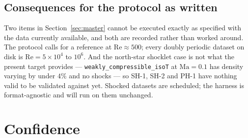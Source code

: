 \documentclass[11pt]{article}
\begin{document}
\subsection{Consequences for the protocol as written}

Two items in Section~\ref{sec:master} cannot be executed exactly as specified with the data
currently available, and both are recorded rather than worked around. The protocol calls for
a reference at $\mathrm{Re} \approx 500$; every doubly periodic dataset on disk is
$\mathrm{Re} = 5\times10^4$ to $10^6$. And the north-star shocklet case is not what the
present target provides --- \texttt{weakly\_compressible\_isoT} at $\mathrm{Ma} = 0.1$ has
density varying by under $4\%$ and no shocks --- so SH-1, SH-2 and PH-1 have nothing valid to
be validated against yet. Shocked datasets are scheduled; the harness is format-agnostic and
will run on them unchanged.

\section{Confidence}
\end{document}

